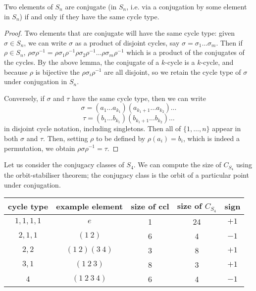 \begin{proposition}
	Two elements of $S_n$ are conjugate (in $S_n$, i.e. via a conjugation by some element in $S_n$) if and only if they have the same cycle type.
\end{proposition}
\begin{proof}
	Two elements that are conjugate will have the same cycle type: given $\sigma \in S_n$, we can write $\sigma$ as a product of disjoint cycles, say $\sigma = \sigma_1\dots\sigma_m$. Then if $\rho \in S_n$, $\rho \sigma \rho^{-1} = \rho \sigma_1 \rho^{-1} \rho \sigma_2 \rho^{-1} \dots \rho \sigma_m \rho^{-1}$ which is a product of the conjugates of the cycles. By the above lemma, the conjugate of a $k$-cycle is a $k$-cycle, and because $\rho$ is bijective the $\rho \sigma_i \rho^{-1}$ are all disjoint, so we retain the cycle type of $\sigma$ under conjugation in $S_n$.

	Conversely, if $\sigma$ and $\tau$ have the same cycle type, then we can write
	\[ \sigma = (a_1\dots a_{k_1})(a_{k_1+1}\dots a_{k_2})\dots \]
	\[ \tau = (b_1\dots b_{k_1})(b_{k_1+1}\dots b_{k_2})\dots \]
	in disjoint cycle notation, including singletons. Then all of $\{ 1, \dots, n \}$ appear in both $\sigma$ and $\tau$. Then, setting $\rho$ to be defined by $\rho(a_i) = b_i$, which is indeed a permutation, we obtain $\rho\sigma\rho^{-1}=\tau$.
\end{proof}
Let us consider the conjugacy classes of $S_4$. We can compute the size of $C_{S_4}$ using the orbit-stabiliser theorem; the conjugacy class is the orbit of a particular point under conjugation.\medskip

\noindent\begin{tabular}{c|c|c|c|c}
	cycle type & example element & size of ccl & size of $C_{S_4}$ & sign \\ \hline
	$1,1,1,1$  & $e$             & 1           & 24                & $+1$ \\
	$2,1,1$    & $(1\ 2)$        & 6           & 4                 & $-1$ \\
	$2,2$      & $(1\ 2)(3\ 4)$  & 3           & 8                 & $+1$ \\
	$3,1$      & $(1\ 2\ 3)$     & 8           & 3                 & $+1$ \\
	$4$        & $(1\ 2\ 3\ 4)$  & 6           & 4                 & $-1$ \\
\end{tabular}

